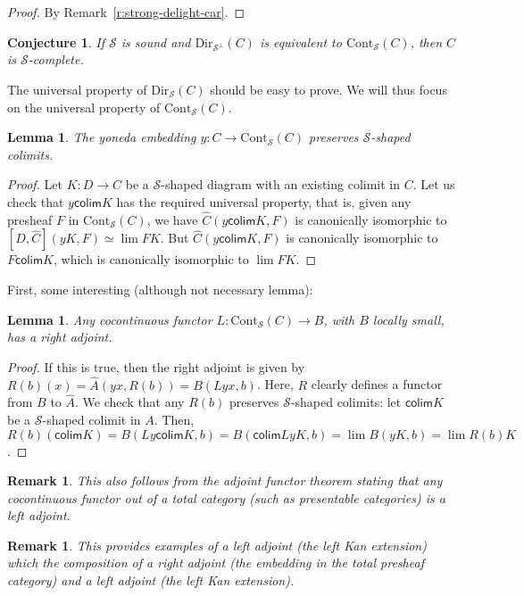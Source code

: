 \documentclass{article}
\newcommand{\Cont}[1]{\text{Cont}_{#1}}
\newcommand{\Dir}[1]{\text{Dir}_{#1}}
\newcommand{\colim}{\mathsf{colim}}
\newtheorem{conjecture}[theorem]{Conjecture}
\newtheorem{remark}[theorem]{Remark}
\newtheorem{lemma}[theorem]{Lemma}
\begin{document}
\begin{proof}
  By Remark~\ref{r:strong-delight-car}.
\end{proof}
\begin{conjecture}
  If $\mathcal{S}$ is sound and
  $\Dir{\mathcal{S}^\bot}(C)$ is equivalent to $\Cont{\mathcal{S}}(C)$, then
  $C$ is $\mathcal{S}$-complete.
\end{conjecture}
  The universal property of $\Dir{\mathcal{S}}(C)$ should be easy to prove.
  We will thus focus on the universal property of $\Cont{\mathcal{S}}(C)$.

  \begin{lemma}
    The yoneda embedding $y : C \rightarrow \Cont{\mathcal{S}}(C)$ preserves
    $\mathcal{S}$-shaped colimits.
  \end{lemma}
  \begin{proof}
    Let $K:D\rightarrow C$ be a $\mathcal{S}$-shaped diagram with an existing colimit in
    $C$. Let us check that $y\colim K$ has the required universal property, that
    is, given any presheaf $F$ in $\Cont{\mathcal{S}}(C)$, we have 
    $\hat{C}(y \colim K, F)$ is canonically isomorphic to $[D, \hat{C}](y K,
    F)\simeq \lim FK$.
    But $\hat{C}(y \colim K, F)$ is canonically isomorphic to $F\colim K$, which
    is canonically isomorphic to $\lim FK$.
  \end{proof}
  First, some interesting (although not necessary lemma):
  \begin{lemma}
    Any cocontinuous functor $L:\Cont{\mathcal{S}}(C)\rightarrow B$,
    with $B$ locally small,
    has a right adjoint.
  \end{lemma}
  \begin{proof}
   If this is true, then the right adjoint is given by $R(b)(x) = \hat{A}(y x,
   R(b)) = B(Ly x, b)$. Here, $R$ clearly defines a functor from $B$ to $\hat{A}$.
   We check that any $R(b)$ preserves $\mathcal{S}$-shaped colimits: let $\colim K$ be a 
   $\mathcal{S}$-shaped colimit in $A$. Then, $R(b)(\colim K) = B(Ly\colim K,b)=
   B(\colim LyK, b) = \lim B(yK,b)=\lim R(b)K$.
   \end{proof}
   \begin{remark}
     This also follows from the adjoint functor theorem stating that any
     cocontinuous functor out of a total category (such as presentable
     categories) is a left adjoint.
   \end{remark}
  \begin{remark}
   This provides examples of a left adjoint (the left Kan extension) which the composition of a right
   adjoint (the embedding in the total presheaf category) and a left adjoint
   (the left Kan extension).
  \end{remark}
\end{document}
